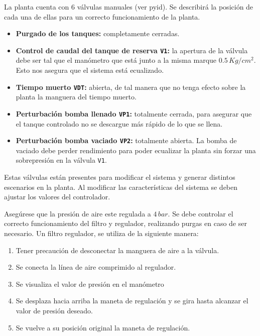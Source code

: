 \begin{tcolorbox}[title=Válvulas manuales, breakable]
La planta cuenta con 6 válvulas manuales (ver \gls{pyid}).
Se describirá la posición de cada una
de ellas para un correcto funcionamiento de la planta.
 
 \begin{itemize}
  \item \textbf{Purgado de los tanques:} completamente cerradas.
  \item \textbf{Control de caudal del tanque de reserva \texttt{V1}:}
  la apertura de la válvula debe ser tal que el manómetro que está junto
  a la misma marque $0.5\,{Kg}/{cm^2}$. Esto nos asegura que el sistema está
  ecualizado.
  \item \textbf{Tiempo muerto \texttt{VDT}:} abierta, de tal manera que no
tenga efecto sobre la  planta la manguera del tiempo muerto.
  \item \textbf{Perturbación bomba llenado \texttt{VP1}:} totalmente cerrada,
para asegurar que el tanque controlado no se descargue más rápido de lo que se
llena.
  \item \textbf{Perturbación bomba vaciado \texttt{VP2}:} totalmente abierta.
  La bomba de vaciado debe perder rendimiento para poder ecualizar la planta
sin forzar una sobrepresión en la válvula \texttt{V1}.
 \end{itemize}
 \tcblower
 Estas válvulas están presentes para modificar el sistema y generar distintos
escenarios en la planta. Al modificar las características del sistema se deben
ajustar los valores del controlador.
\end {tcolorbox}

\begin{tcolorbox}[title=Presión de aire]
  Asegúrese que la presión de aire este regulada a $4\,bar$. Se debe controlar
  el correcto funcionamiento del filtro y regulador, realizando purgas en caso
de ser necesario.
 \tcblower
  Un filtro regulador, se utiliza de la siguiente manera:
 \begin{enumerate}
    \item Tener precaución de desconectar la manguera de aire a la válvula.
    \item Se conecta la línea de aire comprimido al regulador.
    \item Se visualiza el valor de presión en el manómetro
    \item Se desplaza hacia arriba la maneta de regulación y se gira hasta
      alcanzar el valor de presión deseado.
    \item Se vuelve a su posición original la maneta de regulación.
 \end{enumerate}
\end {tcolorbox}


